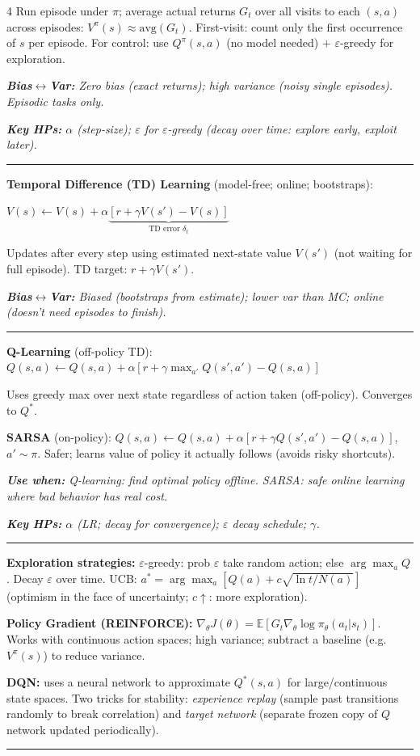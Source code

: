 \documentclass[6.5pt,landscape]{article}
\newcommand{\rl}{\vspace{-1.5pt}\par\noindent\rule{\columnwidth}{0.15pt}\par\vspace{-1pt}}
\newcommand{\sectionrule}{\vspace{-1pt}\par\noindent\rule{\columnwidth}{0.4pt}\par\vspace{-2pt}}
\newcommand{\use}[1]{\textit{\textbf{Use when:} #1}}
\newcommand{\bv}[1]{\textit{\textbf{Bias$\leftrightarrow$Var:} #1}}
\newcommand{\hp}[1]{\textit{\textbf{Key HPs:} #1}}
\newcommand{\E}{\mathbb{E}}
\begin{document}
\begin{multicols*}{4}
Run episode under $\pi$; average actual returns $G_t$ over all visits to each $(s,a)$ across episodes: $V^\pi(s)\approx\text{avg}(G_t)$. First-visit: count only the first occurrence of $s$ per episode. For control: use $Q^\pi(s,a)$ (no model needed) $+$ $\varepsilon$-greedy for exploration.\par
\bv{Zero bias (exact returns); high variance (noisy single episodes). Episodic tasks only.}\par
\hp{$\alpha$ (step-size); $\varepsilon$ for $\varepsilon$-greedy (decay over time: explore early, exploit later).}\par
\rl
\noindent\textbf{Temporal Difference (TD) Learning} (model-free; online; bootstraps):\par
$V(s)\leftarrow V(s)+\alpha\underbrace{[r+\gamma V(s')-V(s)]}_{\text{TD error }\delta_t}$\par
Updates after every step using estimated next-state value $V(s')$ (not waiting for full episode). TD target: $r+\gamma V(s')$.\par
\bv{Biased (bootstraps from estimate); lower var than MC; online (doesn't need episodes to finish).}\par
\rl
\noindent\textbf{Q-Learning} (off-policy TD): $Q(s,a)\leftarrow Q(s,a)+\alpha[r+\gamma\max_{a'}Q(s',a')-Q(s,a)]$\par
Uses greedy max over next state regardless of action taken (off-policy). Converges to $Q^*$.\par
\textbf{SARSA} (on-policy): $Q(s,a)\leftarrow Q(s,a)+\alpha[r+\gamma Q(s',a')-Q(s,a)]$, $a'\sim\pi$. Safer; learns value of policy it actually follows (avoids risky shortcuts).\par
\use{Q-learning: find optimal policy offline. SARSA: safe online learning where bad behavior has real cost.}\par
\hp{$\alpha$ (LR; decay for convergence); $\varepsilon$ decay schedule; $\gamma$.}\par
\rl
\noindent\textbf{Exploration strategies:} $\varepsilon$-greedy: prob $\varepsilon$ take random action; else $\arg\max_a Q$. Decay $\varepsilon$ over time. UCB: $a^*=\arg\max_a[Q(a)+c\sqrt{\ln t/N(a)}]$ (optimism in the face of uncertainty; $c\uparrow$: more exploration).\par
\textbf{Policy Gradient (REINFORCE):} $\nabla_{\theta} J(\theta)=\E[G_t\nabla_{\theta}\log\pi_\theta(a_t|s_t)]$. Works with continuous action spaces; high variance; subtract a baseline (e.g.\ $V^\pi(s)$) to reduce variance.\par
\textbf{DQN:} uses a neural network to approximate $Q^*(s,a)$ for large/continuous state spaces. Two tricks for stability: \emph{experience replay} (sample past transitions randomly to break correlation) and \emph{target network} (separate frozen copy of $Q$ network updated periodically).\par
\sectionrule

\end{multicols*}
\end{document}

